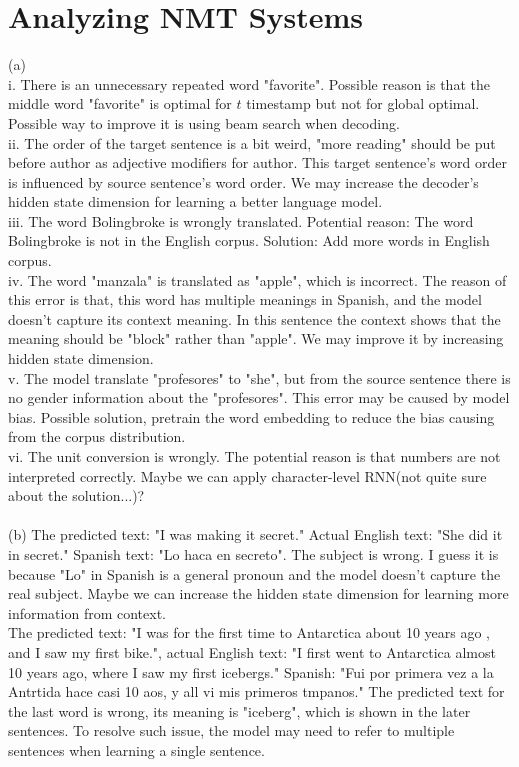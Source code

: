 \documentclass[11pt]{article}
\begin{document}
\section{Analyzing NMT Systems}
(a)\\
i. There is an unnecessary repeated word "favorite". Possible reason is that the middle word "favorite" is optimal for $t$ timestamp but not for global optimal. Possible way to improve it is using beam search when decoding.\\
ii. The order of the target sentence is a bit weird, "more reading" should be put before author as adjective modifiers for author. This target sentence's word order is influenced by source sentence's word order. We may increase the decoder's hidden state dimension for learning a better language model.\\
iii. The word Bolingbroke is wrongly translated. Potential reason: The word Bolingbroke is not in the English corpus. Solution: Add more words in English corpus.\\
iv. The word "manzala" is translated as "apple", which is incorrect. The reason of this error is that, this word has multiple meanings in Spanish, and the model doesn't capture its context meaning. In this sentence the context shows that the meaning should be "block" rather than "apple". We may improve it by increasing hidden state dimension.\\
v. The model translate "profesores" to "she", but from the source sentence there is no gender information about the "profesores". This error may be caused by model bias. Possible solution, pretrain the word embedding to reduce the bias causing from the corpus distribution.\\
vi. The unit conversion is wrongly. The potential reason is that numbers are not interpreted correctly. Maybe we can apply character-level RNN(not quite sure about the solution...)?\\\\
(b) The predicted text: "I was making it secret."
Actual English text: "She did it in secret."
Spanish text: "Lo haca en secreto". The subject is wrong. I guess it is because "Lo" in Spanish is a general pronoun and the model doesn't capture the real subject. Maybe we can increase the hidden state dimension for learning more information from context.\\
The predicted text: "I was for the first time to Antarctica about 10 years ago , and I saw my first bike.", actual English text: "I first went to Antarctica almost 10 years ago,  where I saw my first icebergs." Spanish: "Fui por primera vez a la Antrtida hace casi 10 aos, y all vi mis primeros tmpanos." The predicted text for the last word is wrong, its meaning is "iceberg", which is shown in the later sentences. To resolve such issue, the model may need to refer to multiple sentences when learning a single sentence.\\\\
\end{document}
